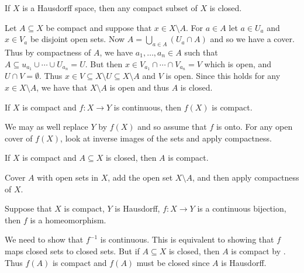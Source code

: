 \documentclass[letterpaper, 11pt, oneside]{book}
\begin{document}
\clearpage

\begin{thrm}\label{thrm: compact_subset_Hausdorff_closed}
  If $X$ is a Hausdorff space, then any compact subset of $X$ is closed.
\end{thrm}
\begin{pf}
  Let $A \subseteq X$ be compact and suppose that $x \in X \setminus A$.
  For $a \in A$ let $a \in U_{a}$ and $x \in V_{a}$ be disjoint open sets.
  Now $A = \bigcup_{a \in A} (U_{a} \cap A)$ and so we have a cover.
  Thus by compactness of $A$, we have $a_{1}, \ldots, a_{n} \in A$ such that $A \subseteq u_{a_{1}} \cup \cdots \cup U_{a_{n}} = U$.
  But then $x \in V_{a_{1}} \cap \cdots \cap V_{a_{n}} = V$ which is open, and $U \cap V = \emptyset$.
  Thus $x \in V \subseteq X \setminus U \subseteq X \setminus A$ and $V$ is open.
  Since this holds for any $x \in X \setminus A$, we have that $X \setminus A$ is open and thus $A$ is closed.
\end{pf}

\begin{thrm}\label{thrm: image_of_compact_is_compact}
  If $X$ is compact and $f\colon X \to Y$ is continuous, then $f(X)$ is compact.
\end{thrm}
\begin{pf}
  We may as well replace $Y$ by $f(X)$ and so assume that $f$ is onto.
  For any open cover of $f(X)$, look at inverse images of the sets and apply compactness.
\end{pf}

\begin{thrm}\label{thrm: closed_subset_of_compact_is_compact}
  If $X$ is compact and $A \subseteq X$ is closed, then $A$ is compact.
\end{thrm}
\begin{pf}
  Cover $A$ with open sets in $X$, add the open set $X \setminus A$, and then apply compactness of $X$.
\end{pf}

\begin{thrm}\label{thrm: bij_comp_to_Haus_is_homeo}
  Suppose that $X$ is compact, $Y$ is Hausdorff, $f\colon X \to Y$ is a continuous bijection, then $f$ is a homeomorphism.
\end{thrm}
\begin{pf}
  We need to show that $f^{-1}$ is continuous.
  This is equivalent to showing that $f$ maps closed sets to closed sets.
  But if $A \subseteq X$ is closed, then $A$ is compact by .
  Thus $f(A)$ is compact and $f(A)$ must be closed since $A$ is Hausdorff.
\end{pf}
\end{document}

